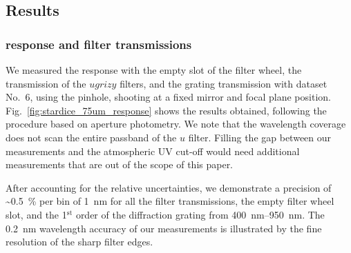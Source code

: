 %
%
%
%

\subsection{Results}
\subsubsection{\SD response and filter transmissions}

We measured the \SD response with the empty slot of the filter wheel, the transmission of the $ugrizy$ filters, and the grating transmission with dataset No.~6, using the \spinhole pinhole, shooting at a fixed mirror and focal plane position. Fig.~\ref{fig:stardice_75um_response} shows the results obtained, following the procedure based on aperture photometry. We note that the wavelength coverage does not scan the entire passband of the $u$ filter. Filling the gap between our measurements and the atmospheric UV cut-off would need additional measurements that are out of the scope of this paper.

After accounting for the relative uncertainties, we demonstrate a precision of \textasciitilde\SI{0.5}{\%} per bin of \SI{1}{nm} for all the filter transmissions, the empty filter wheel slot, and the 1$^\mathrm{st}$ order of the diffraction grating from \SIrange{400}{950}{\nano\meter}. The \SI{0.2}{nm} wavelength accuracy of our measurements is illustrated by the fine resolution of the sharp filter edges.



